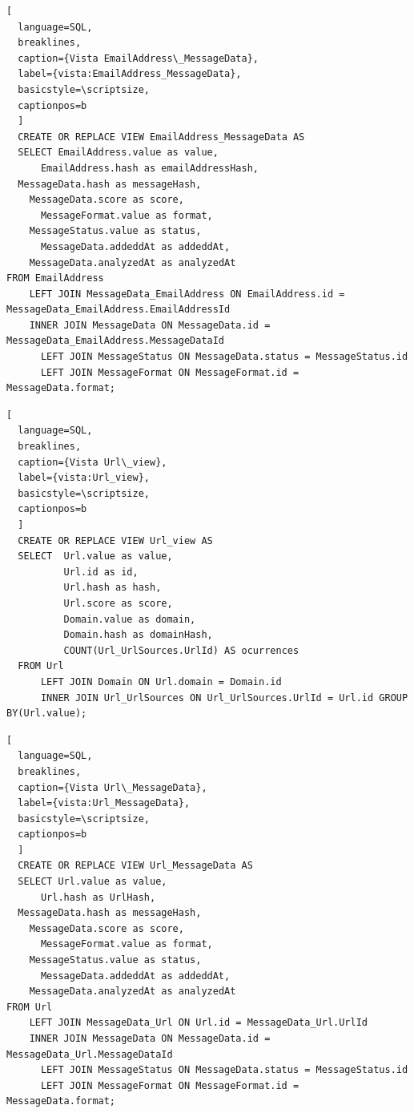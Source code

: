 \begin{lstlisting}[
  language=SQL,
  breaklines, 
  caption={Vista EmailAddress\_MessageData}, 
  label={vista:EmailAddress_MessageData}, 
  basicstyle=\scriptsize,
  captionpos=b
  ]
  CREATE OR REPLACE VIEW EmailAddress_MessageData AS 
  SELECT EmailAddress.value as value,
      EmailAddress.hash as emailAddressHash, 
  MessageData.hash as messageHash,
    MessageData.score as score,
      MessageFormat.value as format,
    MessageStatus.value as status,
      MessageData.addeddAt as addeddAt,
    MessageData.analyzedAt as analyzedAt
FROM EmailAddress 
    LEFT JOIN MessageData_EmailAddress ON EmailAddress.id = MessageData_EmailAddress.EmailAddressId
    INNER JOIN MessageData ON MessageData.id = MessageData_EmailAddress.MessageDataId
      LEFT JOIN MessageStatus ON MessageData.status = MessageStatus.id
      LEFT JOIN MessageFormat ON MessageFormat.id = MessageData.format;
\end{lstlisting}

\begin{lstlisting}[
  language=SQL,
  breaklines, 
  caption={Vista Url\_view}, 
  label={vista:Url_view}, 
  basicstyle=\scriptsize,
  captionpos=b
  ]
  CREATE OR REPLACE VIEW Url_view AS 
  SELECT  Url.value as value, 
          Url.id as id,
          Url.hash as hash, 
          Url.score as score, 
          Domain.value as domain,
          Domain.hash as domainHash, 
          COUNT(Url_UrlSources.UrlId) AS ocurrences  
  FROM Url
      LEFT JOIN Domain ON Url.domain = Domain.id
      INNER JOIN Url_UrlSources ON Url_UrlSources.UrlId = Url.id GROUP BY(Url.value);
\end{lstlisting}

\begin{lstlisting}[
  language=SQL,
  breaklines, 
  caption={Vista Url\_MessageData}, 
  label={vista:Url_MessageData}, 
  basicstyle=\scriptsize,
  captionpos=b
  ]
  CREATE OR REPLACE VIEW Url_MessageData AS 
  SELECT Url.value as value,
      Url.hash as UrlHash, 
  MessageData.hash as messageHash,
    MessageData.score as score,
      MessageFormat.value as format,
    MessageStatus.value as status,
      MessageData.addeddAt as addeddAt,
    MessageData.analyzedAt as analyzedAt
FROM Url 
    LEFT JOIN MessageData_Url ON Url.id = MessageData_Url.UrlId
    INNER JOIN MessageData ON MessageData.id = MessageData_Url.MessageDataId
      LEFT JOIN MessageStatus ON MessageData.status = MessageStatus.id
      LEFT JOIN MessageFormat ON MessageFormat.id = MessageData.format;
\end{lstlisting}


